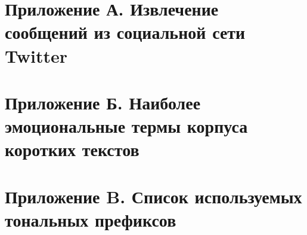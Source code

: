 \documentclass[a4paper,14pt]{extarticle}
\begin{document}
\renewcommand{\figurename}{Рисунок}

\renewcommand{\baselinestretch}{1.5}

%
%
\newcommand\twitter{{\it Twitter }}

%
%
\renewcommand{\abstractname}{{Аннотация}}

\clearpage

%
%
\renewcommand{\contentsname}{\centering Содержание}
\tableofcontents

%
%


%
%



%
%


%
%


%
%


%
%


%
%


%
%
\newpage


%
%
\newpage
{}
\section*{Приложение А. Извлечение сообщений из социальной сети Twitter}

\newpage
{}
\section*{Приложение Б. Наиболее эмоциональные термы корпуса коротких текстов}

\newpage
{}
\section*{Приложение B. Список используемых тональных префиксов}


%
%
\clearpage
\newpage
\begin{flushleft}
\end{flushleft}
\end{document}
